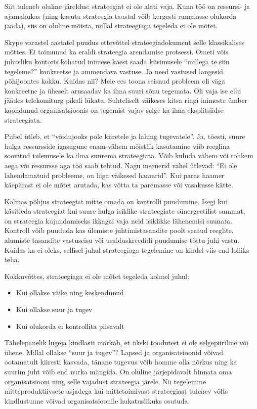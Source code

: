 \documentclass{tufte-book}
\begin{document}
Siit tuleneb oluline järeldus: strateegiat ei ole alati vaja. Kuna töö on ressursi- ja ajamahukas (ning kasutu strateegia taustal võib kergesti rumalasse olukorda jääda), siis on oluline mõista, millal strateegiaga tegeleda ei ole mõtet.

Skype varastel aastatel puudus ettevõttel strateegiadokument selle klassikalises mõttes. Ei toimunud ka eraldi strateegia arendamise protsessi. Ometi võis juhusliku kontoris kohatud inimese käest saada küsimusele \enquote{millega te siin tegeleme?} konkreetse ja ammendava vastuse. Ja need vastused langesid põhijoontes kokku. Kuidas nii? Meie ees toona seisnud probleem oli väga konkreetne ja üheselt arusaadav ka ilma suuri sõnu tegemata. Oli vaja ise ellu jäädes telekomiturg pikali lükata. Suhteliselt väikeses kitsa ringi inimeste ümber koondunud organisatsioonis on tegemist vajav selge ka ilma eksplitsiidse strateegiata. 

Piibel ütleb, et \enquote{võidujooks pole kiiretele ja lahing tugevatele}. Ja, tõesti, suure hulga ressursside igasugune enam-vähem mõistlik kasutamine viib reeglina soovitud tulemusele ka ilma suurema strateegiata. Võib kuluda vähem või rohkem aega või ressursse aga töö saab tehtud. Nagu insenerid vahel ütlevad: \enquote{Ei ole lahendamatuid probleeme, on liiga väikesed haamrid}. Kui paras haamer käepärast ei ole mõtet arutada, kas võtta ta paremasse või vasakusse kätte.

Kolmas põhjus strateegiat mitte omada on kontrolli puudumine. Isegi kui käsitleda strateegiat kui suure hulga isiklike strateegiate sünergeetilist summat, on strateegia kujundamiseks ikkagai vaja neid isiklikke lähenemisi suunata. Kontroll võib puududa kas ülemiste juhtimistasandite poolt seatud reeglite, alumiste tasandite vastuseisu või usalduskreedidi puudumise tõttu juhi vastu. Kuidas ka ei oleks, sellisel juhul strateegiaga tegelemine on kindel viis end lolliks teha. 

Kokkuvõttes, strateegiaga ei ole mõtet tegeleda kolmel juhul:
\begin{itemize}
	\item Kui ollakse väike ning keskendunud
	\item Kui ollakse suur ja tugev
	\item Kui olukorda ei kontrollita piisavalt
\end{itemize}

Tähelepanelik lugeja kindlasti märkab, et ükski toodutest ei ole selgepiiriline või ühene. Millal ollakse \enquote{suur ja tugev}? Lapsed ja organisatsioonid võivad ootamatult kiiresti kasvada, tänane tugevus võib homme olla nõrkus ning ka suurim juht võib end nurka mängida. On oluline järjepidavalt hinnata oma organisatsiooni ning selle vajadust strateegia järele. Nii tegelemine mitteproduktiivsete asjadega kui mittetoimivast strateegiast tulenev võlts kindlustunne võivad organisatsioonile hukatuslikuks osutuda. 
\end{document}
